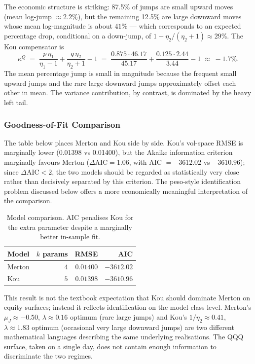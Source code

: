 The economic structure is striking: 87.5\% of jumps are small upward
moves (mean log-jump $\approx 2.2\%$), but the remaining 12.5\% are
large downward moves whose mean log-magnitude is about $41\%$ --- which
corresponds to an expected percentage drop, conditional on a down-jump,
of $1 - \eta_2/(\eta_2 + 1) \approx 29\%$. The Kou compensator is
\[
   \kappa^Q \;=\; \frac{p\,\eta_1}{\eta_1 - 1}
                 + \frac{q\,\eta_2}{\eta_2 + 1} - 1
              \;=\; \frac{0.875 \cdot 46.17}{45.17}
                  + \frac{0.125 \cdot 2.44}{3.44} - 1
              \;\approx\; -1.7\%.
\]
The mean percentage jump is small in magnitude because the frequent
small upward jumps and the rare large downward jumps approximately
offset each other in mean. The variance contribution, by contrast, is
dominated by the heavy left tail.

\subsubsection*{Goodness-of-Fit Comparison}

The table below places Merton and Kou side by side. Kou's vol-space
RMSE is marginally lower (0.01398 vs 0.01400), but the Akaike
information criterion marginally favours Merton ($\Delta\text{AIC} =
1.06$, with AIC $= -3612.02$ vs $-3610.96$); since $\Delta\text{AIC} < 2$,
the two models should be regarded as statistically very close rather
than decisively separated by this criterion. The peso-style
identification problem discussed below offers a more economically
meaningful interpretation of the comparison.

\begin{table}[H]
\centering
\caption{Model comparison. AIC penalises Kou for the extra parameter
despite a marginally better in-sample fit.}
\begin{tabular}{lrrr}
\toprule
Model  & $k$ params & RMSE     & AIC        \\
\midrule
Merton & $4$        & $0.01400$ & $-3612.02$ \\
Kou    & $5$        & $0.01398$ & $-3610.96$ \\
\bottomrule
\end{tabular}
\end{table}

This result is not the textbook expectation that Kou should dominate
Merton on equity surfaces; instead it reflects identification on the
model-class level. Merton's $\mu_J \approx -0.50$,
$\lambda \approx 0.16$ optimum (rare large jumps) and Kou's
$1/\eta_2 \approx 0.41$, $\lambda \approx 1.83$ optimum (occasional
very large downward jumps) are two different mathematical languages
describing the same underlying realisations. The QQQ surface, taken on
a single day, does not contain enough information to discriminate the
two regimes.


